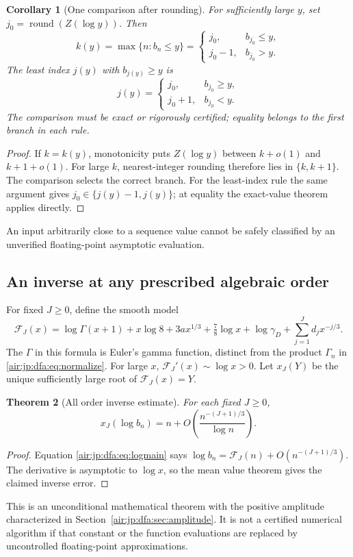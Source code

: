 \documentclass[11pt,letterpaper]{article}
\numberwithin{equation}{section}
\newtheorem{theorem}{Theorem}[section]
\newtheorem{corollary}[theorem]{Corollary}
\theoremstyle{remark}
\begin{document}
\begin{corollary}[One comparison after rounding]\label{air:jp:dfa:cor:threshold}
For sufficiently large $y$, set $j_0=\operatorname{round}(Z(\log y))$. Then
\[
 k(y)=\max\{n:b_n\le y\}
 =\begin{cases}j_0,&b_{j_0}\le y,\\j_0-1,&b_{j_0}>y.\end{cases}
\]
The least index $j(y)$ with $b_{j(y)}\ge y$ is
\[
 j(y)=\begin{cases}j_0,&b_{j_0}\ge y,\\j_0+1,&b_{j_0}<y.\end{cases}
\]
The comparison must be exact or rigorously certified; equality belongs to the first branch in each rule.
\end{corollary}
\begin{proof}
If $k=k(y)$, monotonicity puts $Z(\log y)$ between $k+o(1)$ and $k+1+o(1)$. For large $k$, nearest-integer rounding therefore lies in $\{k,k+1\}$. The comparison selects the correct branch. For the least-index rule the same argument gives $j_0\in\{j(y)-1,j(y)\}$; at equality the exact-value theorem applies directly.
\end{proof}
An input arbitrarily close to a sequence value cannot be safely classified by an unverified floating-point asymptotic evaluation.

\subsection{An inverse at any prescribed algebraic order}
For fixed $J\ge0$, define the smooth model
\begin{equation}\label{air:jp:dfa:eq:FJ}
 \mathcal F_J(x)=\log\Gamma(x+1)+x\log8+3ax^{1/3}+\tfrac78\log x
 +\log\gamma_D+\sum_{j=1}^Jd_jx^{-j/3}.
\end{equation}
The $\Gamma$ in this formula is Euler's gamma function, distinct from the product $\Gamma_n$ in \eqref{air:jp:dfa:eq:normalize}. For large $x$, $\mathcal F_J'(x)\sim\log x>0$. Let $x_J(Y)$ be the unique sufficiently large root of $\mathcal F_J(x)=Y$.

\begin{theorem}[All order inverse estimate]\label{air:jp:dfa:thm:sharpinverse}
For each fixed $J\ge0$,
\begin{equation}\label{air:jp:dfa:eq:sharpinverse}
 x_J(\log b_n)=n+O\!\left(\frac{n^{-(J+1)/3}}{\log n}\right).
\end{equation}
\end{theorem}
\begin{proof}
Equation \eqref{air:jp:dfa:eq:logmain} says
$\log b_n=\mathcal F_J(n)+O(n^{-(J+1)/3})$. The derivative is asymptotic to $\log x$, so the mean value theorem gives the claimed inverse error.
\end{proof}
This is an unconditional mathematical theorem with the positive amplitude characterized in Section~\ref{air:jp:dfa:sec:amplitude}. It is not a certified numerical algorithm if that constant or the function evaluations are replaced by uncontrolled floating-point approximations.
\end{document}
